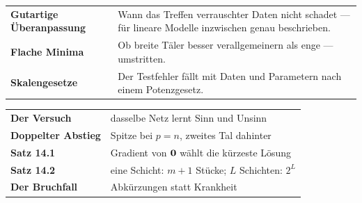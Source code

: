 \begin{forschung}
\begin{center}
{\small
\renewcommand{\arraystretch}{1.45}
\begin{tabular}{@{}P{2.8cm}P{5.4cm}@{}}
\toprule
\textbf{Gutartige Überanpassung} & Wann das Treffen verrauschter Daten nicht schadet --- für lineare Modelle inzwischen genau beschrieben.\\
\textbf{Flache Minima} & Ob breite Täler besser verallgemeinern als enge --- umstritten.\\
\textbf{Skalengesetze} & Der Testfehler fällt mit Daten und Parametern nach einem Potenzgesetz.\\
\bottomrule
\end{tabular}}
\end{center}

\begin{center}
\begin{minipage}{0.88\textwidth}
\end{minipage}
\end{center}
\end{forschung}

\begin{merksatz}
\begin{center}
\renewcommand{\arraystretch}{1.5}
\begin{tabular}{@{}P{3.0cm}P{5.6cm}@{}}
\toprule
\textbf{Der Versuch} & dasselbe Netz lernt Sinn und Unsinn\\
\textbf{Doppelter Abstieg} & Spitze bei $p = n$, zweites Tal dahinter\\
\textbf{Satz 14.1} & Gradient von $\boldsymbol{0}$ wählt die kürzeste Lösung\\
\textbf{Satz 14.2} & eine Schicht: $m+1$ Stücke; $L$ Schichten: $2^{L}$\\
\textbf{Der Bruchfall} & Abkürzungen statt Krankheit\\
\bottomrule
\end{tabular}
\end{center}

\begin{center}
\begin{minipage}{0.88\textwidth}
\end{minipage}
\end{center}
\end{merksatz}
